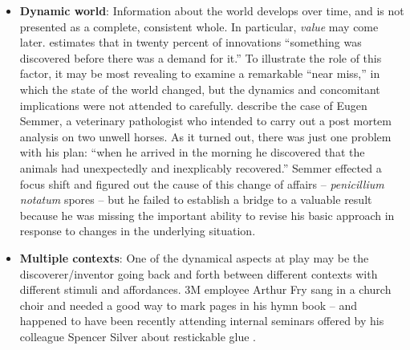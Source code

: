 \begin{itemize}
\item \textbf{Dynamic world}: Information about the world develops
  over time, and is not presented as a complete, consistent whole.  In
  particular, \emph{value} may come later.
   estimates that in twenty percent of
  innovations ``something was discovered before there was a demand for
  it.''  To illustrate the role of this factor, it may be most
  revealing to examine a remarkable ``near miss,'' in which the state
  of the world changed, but the dynamics and concomitant implications
  were not attended to carefully.
  \citet[pp.~75-76]{cropley2013creativity} describe the case of Eugen
  Semmer, a veterinary pathologist who intended to carry out a post
  mortem analysis on two unwell horses.  As it turned out, there was
  just one problem with his plan: ``when he arrived in the morning he
  discovered that the animals had unexpectedly and inexplicably
  recovered.''  %
Semmer effected a focus shift and figured out the cause of this change
of affairs -- \emph{penicillium notatum} spores -- but he failed to
establish a bridge to a valuable result because he was missing the
important ability \cite{bereiter1997situated} to revise his basic
approach in response to changes in the underlying situation.
\end{itemize}

\begin{itemize}
\item \textbf{Multiple contexts}: One of the dynamical aspects at play
  may be the discoverer/inventor going back and forth between
  different contexts with different stimuli and affordances.  3M
  employee Arthur Fry sang in a church choir and needed a good way to
  mark pages in his hymn book -- and happened to have been recently
  attending internal seminars offered by his colleague Spencer Silver
  about restickable glue \cite{tce-postits}.
\end{itemize}

